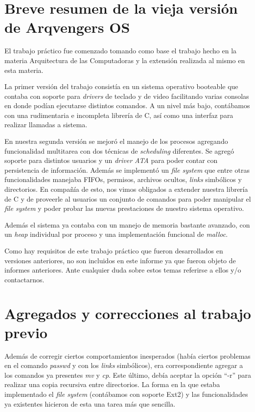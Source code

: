 \documentclass[a4paper,10pt]{article}
\begin{document}
\newpage
\section{Breve resumen de la vieja versión de Arqvengers OS}
El trabajo práctico fue comenzado tomando como base el trabajo hecho en la materia Arquitectura de las Computadoras y la extensión 
realizada al mismo en esta materia.

La primer versión del trabajo consistía en un sistema operativo booteable que contaba con soporte para \textit{drivers} de
 teclado y de video facilitando varias consolas en donde podían ejecutarse distintos comandos. 
A un nivel más bajo, contábamos con una rudimentaria e incompleta librería de C, así como una interfaz para realizar 
llamadas a sistema.

En nuestra segunda versión se mejoró el manejo de los procesos agregando funcionalidad multitarea con dos técnicas de 
\textit{scheduling} diferentes. Se agregó soporte para distintos usuarios y un \textit{driver ATA} para poder contar con persistencia 
de información. Además se implementó un \textit{file system} que entre otras funcionalidades manejaba FIFOs, permisos, 
archivos ocultos, \textit{links} simbólicos y directorios. En compañía de esto, nos vimos obligados a extender nuestra librería de 
C y de proveerle al usuarios un conjunto de comandos para poder manipular el \textit{file system} y poder probar las nuevas 
prestaciones de nuestro sistema operativo. 

Además el sistema ya contaba con un manejo de memoria bastante avanzado, con un \textit{heap} individual por proceso y una implementación
funcional de \textit{malloc}.

Como hay requisitos de este trabajo práctico que fueron desarrollados en versiones anteriores, no son incluidos en este informe ya que fueron
objeto de informes anteriores. Ante cualquier duda sobre estos temas referirse a ellos y/o contactarnos.

\newpage

\section{Agregados y correcciones al trabajo previo}

Además de corregir ciertos comportamientos inesperados (había ciertos problemas en el comando \textit{passwd} y con los
\textit{links} simbólicos), era correspondiente agregar a los comandos ya presentes \textit{mv} y \textit{cp}. Este último, 
debía aceptar la opción ``-r'' para realizar una copia recursiva entre directorios. La forma en la que estaba implementado 
el \textit{file system} (contábamos con soporte Ext2) y las funcionalidades ya existentes hicieron de esta una tarea más que sencilla.
\end{document}
